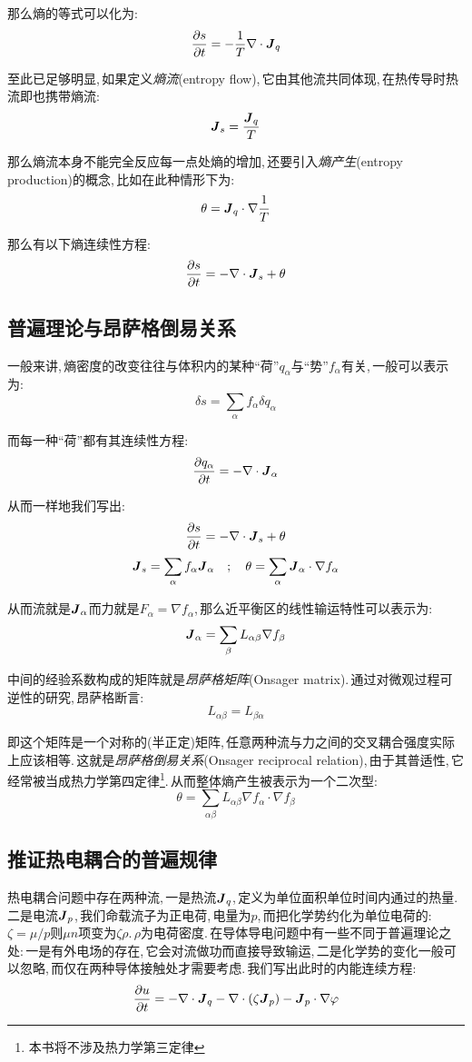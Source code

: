那么熵的等式可以化为:
\[\frac{\partial s}{\partial t}=-\frac{1}{T}\nabla\cdot\boldsymbol{J}_q\]

至此已足够明显,\,如果定义\emph{熵流}(entropy flow),\,它由其他流共同体现,\,在热传导时热流即也携带熵流:
\[\boldsymbol{J}_s=\frac{\boldsymbol{J}_q}{T}\]

那么熵流本身不能完全反应每一点处熵的增加,\,还要引入\emph{熵产生}(entropy production)的概念,\,比如在此种情形下为:
\[\theta=\boldsymbol{J}_q\cdot\nabla\frac{1}{T}\]

那么有以下熵连续性方程:
\[\frac{\partial s}{\partial t}=-\nabla\cdot\boldsymbol{J}_s+\theta\]

\subsection{普遍理论与昂萨格倒易关系}
一般来讲,\,熵密度的改变往往与体积内的某种``荷''\(q_\alpha\)与``势''\(f_\alpha\)有关,\,一般可以表示为:
\[\delta s=\sum_\alpha f_\alpha \delta q_\alpha\]

而每一种``荷''都有其连续性方程:
\[\frac{\partial q_\alpha}{\partial t}=-\nabla\cdot \boldsymbol{J}_\alpha\]

从而一样地我们写出:
\[\frac{\partial s}{\partial t}=-\nabla\cdot\boldsymbol{J}_s+\theta\]
\[\boldsymbol{J}_s=\sum_\alpha f_\alpha \boldsymbol{J}_\alpha\quad ;\quad \theta=\sum_\alpha \boldsymbol{J}_\alpha\cdot\nabla f_\alpha\]

从而流就是\(\boldsymbol{J}_\alpha\)而力就是\(F_\alpha=\nabla f_\alpha\),\,那么近平衡区的线性输运特性可以表示为:
\[\boldsymbol{J}_\alpha=\sum_\beta L_{\alpha\beta}\nabla f_\beta\]

中间的经验系数构成的矩阵就是\emph{昂萨格矩阵}(Onsager matrix).\,通过对微观过程可逆性的研究,\,昂萨格断言:
\[L_{\alpha\beta}=L_{\beta\alpha}\]

即这个矩阵是一个对称的(半正定)矩阵,\,任意两种流与力之间的交叉耦合强度实际上应该相等.\,这就是\emph{昂萨格倒易关系}(Onsager reciprocal relation),\,由于其普适性,\,它经常被当成热力学第四定律\footnote{本书将不涉及热力学第三定律}.\,从而整体熵产生被表示为一个二次型:
\[\theta=\sum_{\alpha\beta} L_{\alpha\beta}\nabla f_\alpha\cdot\nabla f_\beta\]

\subsection{推证热电耦合的普遍规律}
热电耦合问题中存在两种流,\,一是热流\(\boldsymbol{J}_q\),\,定义为单位面积单位时间内通过的热量.\,二是电流\(\boldsymbol{J}_p\),\,我们命载流子为正电荷,\,电量为\(p\),\,而把化学势约化为单位电荷的:\,\(\zeta=\mu/p\)则\(\mu n\)项变为\(\zeta\rho\).\,\(\rho\)为电荷密度.\,在导体导电问题中有一些不同于普遍理论之处:\,一是有外电场的存在,\,它会对流做功而直接导致输运,\,二是化学势的变化一般可以忽略,\,而仅在两种导体接触处才需要考虑.\,我们写出此时的内能连续方程:
\[\frac{\partial u}{\partial t}=-\nabla\cdot\boldsymbol{J}_q-\nabla\cdot(\zeta \boldsymbol{J}_p)-\boldsymbol{J}_p\cdot\nabla\varphi\]

